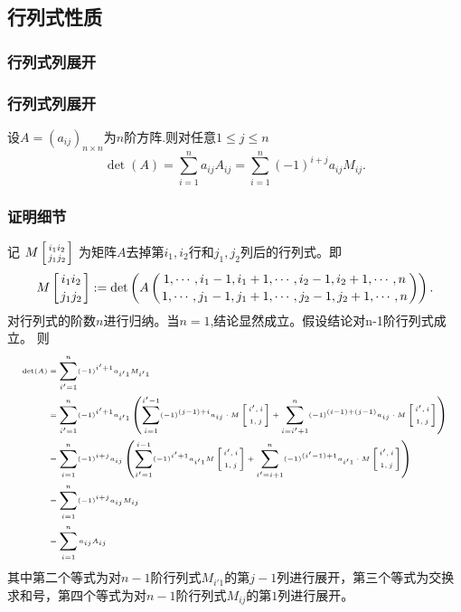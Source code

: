 \subsection{行列式性质}


\subsubsection{行列式列展开}
\begin{frame}\frametitle{行列式列展开}
\begin{theorem}[行列式列展开]
设$A=(a_{ij})_{n\times n}$为$n$阶方阵.则对任意$1\leq j \leq n$
\[\boxed{\det(A)=\sum_{i=1}^na_{ij}A_{ij} = \sum_{i=1}^{n}(-1)^{i+j}a_{ij}M_{ij}.}\]
\end{theorem}
\end{frame}





\begin{frame}\frametitle{证明细节}
{\tiny 记 $M\left[{{i_1i_2}\atop {j_1j_2}}\right]$ 为矩阵$A$去掉第$i_1,i_2$行和$j_1,j_2$列后的行列式。即
\[ M\left[{{i_1i_2}\atop {j_1j_2}}\right]:=\det\left(A\left({1,\cdots,i_1-1,i_1+1,\cdots,i_2-1,i_2+1,\cdots,n} \atop {1,\cdots,j_1-1,j_1+1,\cdots,j_2-1,j_2+1,\cdots,n}\right)\right).\]
\pp
对行列式的阶数$n$进行归纳。当$n=1$,结论显然成立。假设结论对n-1阶行列式成立。
\pp
则}
\begin{equation*} \tiny
\begin{split}
\det(A)
& = \sum_{i' =1}^{n} (-1)^{i' +1}a_{i' 1}M_{i' 1} \\ 
& = \sum_{i' =1}^{n} (-1)^{i' +1}a_{i' 1} \left(\sum_{i =1}^{i' -1} (-1)^{(j-1)+i } a_{i j}  \cdot M\left[{i' ,i }\atop{1,j}\right] + \sum_{i =i' +1}^{n}(-1)^{(i -1)+(j-1)} a_{i j} \cdot M\left[{i' ,i }\atop{1,j}\right] \right)\\ 
& = \sum_{i =1}^{n} (-1)^{i +j}a_{i j}\left(\sum_{i' =1}^{i -1} (-1)^{i' +1} a_{i' 1} M\left[{i' ,i }\atop{1,j}\right] + \sum_{i' =i +1}^{n}(-1)^{(i' -1)+1} a_{i' 1}  \cdot  M\left[{i' ,i }\atop{1,j}\right] \right)\\ 
& = \sum_{i =1}^{n} (-1)^{i +j}a_{i j} M_{i j} \\  
& = \sum_{i=1}^{n} a_{ij}A_{ij} \\ 
\end{split}
\end{equation*}
\pp
{\tiny 其中第二个等式为对$n-1$阶行列式$M_{i'1}$的第$j-1$列进行展开，第三个等式为交换求和号，第四个等式为对$n-1$阶行列式$M_{ij}$的第$1$列进行展开。
}
\end{frame}



